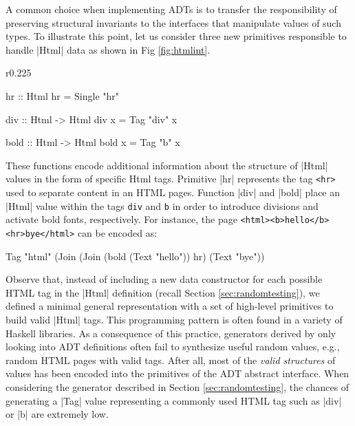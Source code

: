 A common choice when implementing ADTs is to transfer the responsibility of
preserving structural invariants to the interfaces that manipulate values of
such types.
%
To illustrate this point, let us consider three new primitives responsible to
handle |Html| data as shown in Fig \ref{fig:htmlint}.
%
\begin{wrapfigure}{r}{0.225\textwidth}
\vspace{-10pt}
\hspace{-10pt}
\begin{code}
hr :: Html
hr = Single "hr"

div :: Html -> Html
div x = Tag "div" x

bold :: Html -> Html
bold x = Tag "b" x
\end{code}
\caption{Abstract interface of the type |Html|.}
\label{fig:htmlint}
\vspace{-10pt}
\end{wrapfigure}
%
%
These functions encode additional information about the structure of |Html|
values in the form of specific Html tags.
%
Primitive |hr| represents the tag \texttt{<hr>} used to separate content in an
HTML pages.
%
Function |div| and |bold| place an |Html| value within the tags \texttt{div} and
\texttt{b} in order to introduce divisions and activate bold fonts,
respectively.
%
For instance, the page \texttt{<html><b>hello</b><hr>bye</html>} can be encoded
as:

\begin{code}
Tag "html" (Join (Join
  (bold (Text "hello")) hr) (Text "bye"))
\end{code}

%
Observe that, instead of including a new data constructor for each possible HTML
tag in the |Html| definition (recall Section \ref{sec:randomtesting}), we
defined a minimal general representation with a set of high-level primitives to
build valid |Html| tags.
%
%
This programming pattern is often found in a variety of Haskell libraries.
%
%
As a consequence of this practice, generators derived by only looking into ADT
definitions often fail to synthesize useful random values, e.g., random HTML
pages with valid tags.
%
After all, most of the \emph{valid structures} of values has been encoded into
the primitives of the ADT abstract interface.
%
When considering the generator described in Section \ref{sec:randomtesting}, the
chances of generating a |Tag| value representing a commonly used HTML tag such
as |div| or |b| are extremely low.


